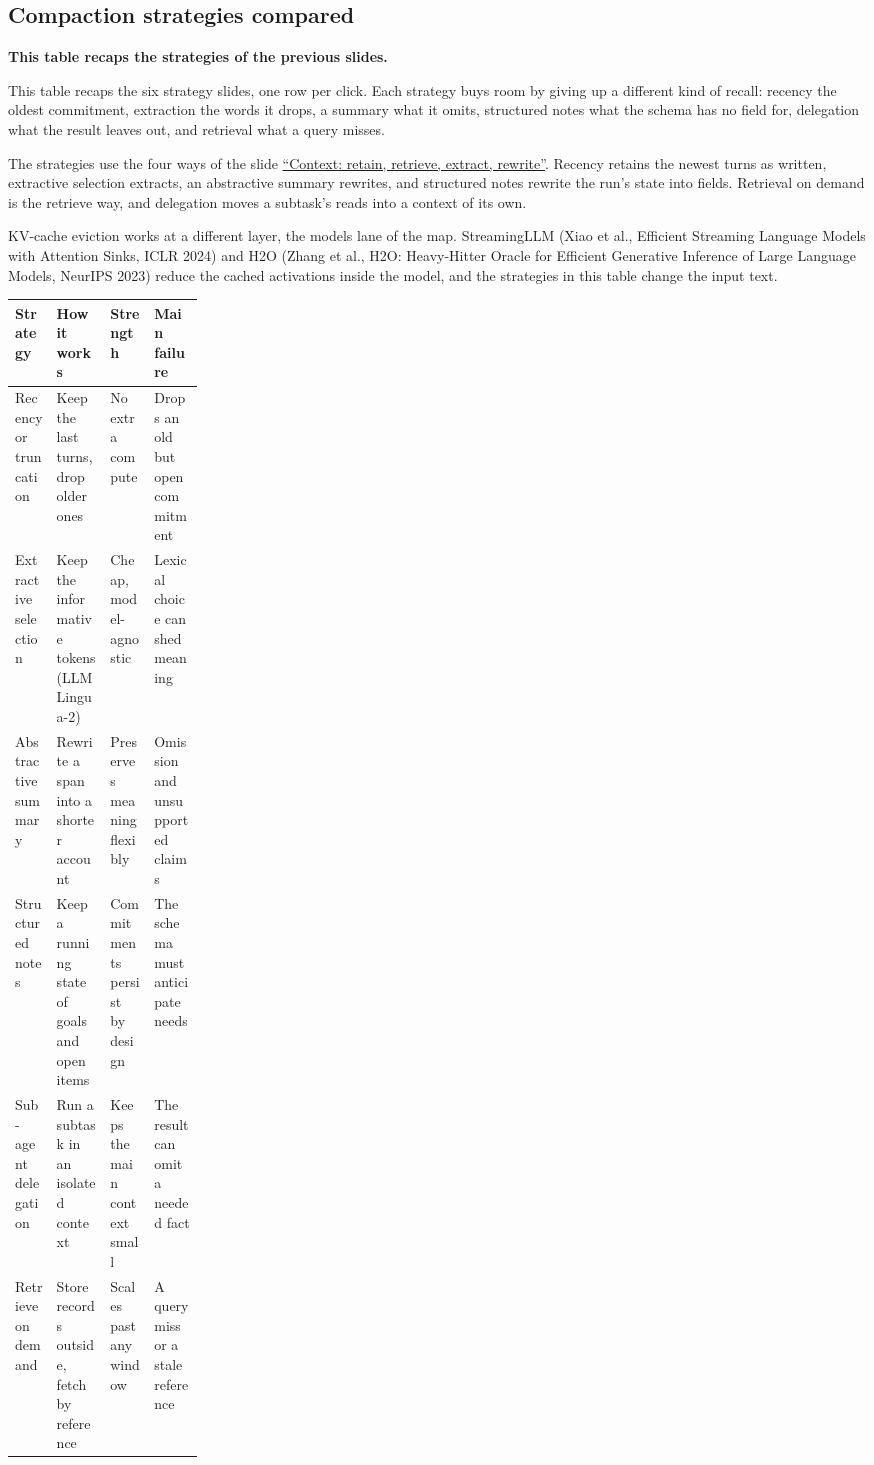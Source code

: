 \subsection{Compaction strategies compared}
\label{sec:it-7-4g}

\textbf{This table recaps the strategies of the previous slides.}

This table recaps the six strategy slides, one row per click. Each strategy buys room by giving up a different kind of recall: recency the oldest commitment, extraction the words it drops, a summary what it omits, structured notes what the schema has no field for, delegation what the result leaves out, and retrieval what a query misses.

The strategies use the four ways of the slide \hyperref[sec:it-7-1]{``Context: retain, retrieve, extract, rewrite''}. Recency retains the newest turns as written, extractive selection extracts, an abstractive summary rewrites, and structured notes rewrite the run's state into fields. Retrieval on demand is the retrieve way, and delegation moves a subtask's reads into a context of its own.

KV-cache eviction works at a different layer, the models lane of the map. StreamingLLM (Xiao et al., Efficient Streaming Language Models with Attention Sinks, ICLR 2024) and H2O (Zhang et al., H2O: Heavy-Hitter Oracle for Efficient Generative Inference of Large Language Models, NeurIPS 2023) reduce the cached activations inside the model, and the strategies in this table change the input text.

\begin{center}\footnotesize
\begin{tabularx}{\linewidth}{L{0.22\linewidth}XXX}
\toprule
\textbf{Strategy} & \textbf{How it works} & \textbf{Strength} & \textbf{Main failure} \\
\midrule
Recency or truncation & Keep the last turns, drop older ones & No extra compute & Drops an old but open commitment \\
Extractive selection & Keep the informative tokens (LLMLingua-2) & Cheap, model-agnostic & Lexical choice can shed meaning \\
Abstractive summary & Rewrite a span into a shorter account & Preserves meaning flexibly & Omission and unsupported claims \\
Structured notes & Keep a running state of goals and open items & Commitments persist by design & The schema must anticipate needs \\
Sub-agent delegation & Run a subtask in an isolated context & Keeps the main context small & The result can omit a needed fact \\
Retrieve on demand & Store records outside, fetch by reference & Scales past any window & A query miss or a stale reference \\
\bottomrule
\end{tabularx}
\end{center}

